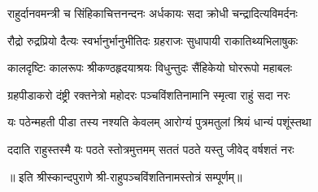 

\twolineshloka
{राहुर्दानवमन्त्री च सिंहिकाचित्तनन्दनः}
{अर्धकायः सदा क्रोधी चन्द्रादित्यविमर्दनः}

\twolineshloka
{रौद्रो रुद्रप्रियो दैत्यः स्वर्भानुर्भानुभीतिदः}
{ग्रहराजः सुधापायी राकातिथ्यभिलाषुकः}

\twolineshloka
{कालदृष्टिः कालरूपः श्रीकण्ठहृदयाश्रयः}
{विधुन्तुदः सैंहिकेयो घोररूपो महाबलः}

\twolineshloka
{ग्रहपीडाकरो दंष्ट्री रक्तनेत्रो महोदरः}
{पञ्चविंशतिनामानि स्मृत्वा राहुं सदा नरः}

\twolineshloka
{यः पठेन्महती पीडा तस्य नश्यति केवलम्}
{आरोग्यं पुत्रमतुलां श्रियं धान्यं पशूंस्तथा}

\twolineshloka
{ददाति राहुस्तस्मै यः पठते स्तोत्रमुत्तमम्}
{सततं पठते यस्तु जीवेद् वर्षशतं नरः}

॥ इति श्रीस्कान्दपुराणे श्री-राहुपञ्चविंशतिनामस्तोत्रं सम्पूर्णम्॥

